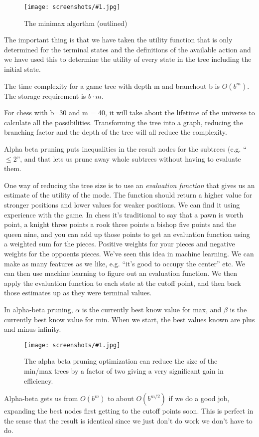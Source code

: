 \documentclass[a4, 12pt, english, USenglish]{scrreprt}
\newcommand{\screenshot}[2]{
\begin{figure}[htb]
\texttt{[image: screenshots/\#1.jpg]}
\label{#1}
\caption{#2}
\end{figure}}
\newcommand{\idx}[1]{{\em #1}\index{#1}}
\begin{document}
\screenshot{minmaxalgorithm}{The minimax algorthm (outlined)}

The important thing is that we have taken the utility function that is
only determined for the terminal states and the definitions of the
available action and we have used this to determine the utility of
every state in the tree including the initial state.  

The time complexity for a game tree with depth m and branchout b is
\(O(b^m)\).  The storage requirement is \(b\cdot m\).

For chess with b=30 and m = 40, it will take about the lifetime of the
universe to calculate all the possibilities.   Transforming the tree
into a graph, reducing the branching factor and the depth of the
tree will all reduce the complexity.

Alpha beta pruning puts inequalities in the result nodes for the
subtrees (e.g. ``\(\leq 2\)'', and that lets us prune away whole
subtrees  without having to evaluate them.

One way of reducing the tree size is to use an \idx{evaluation
  function} that gives us an estimate of the utility of the mode.  The
function should return a higher value for stronger positions and lower
values for weaker positions.  We can find it using experience with the
game.  In chess it's traditional to say that a pawn is worth  point,
a knight three points a rook three points a bishop five points and the
queen nine, and you can add up those points to get an evaluation
function using a weighted sum for the pieces. Positive weights for
your pieces and negative weights for the oppoents pieces.  We've seen
this idea in machine learning.   We can make as many features as we
like, e.g. ``it's good to occupy the center''  etc.   We can then use
machine learning to figure out an evaluation function. We then apply
the evaluation function to each state at the cutoff point, and then
back those estimates up as they were terminal values.

In alpha-beta pruning, \(\alpha\) is the  currently best know value
for max, and \(\beta\) is the currently best know value for min.  When
we start, the best values known are plus and minus infinity.

\screenshot{alphabetapruning}{The alpha beta pruning optimization can
  reduce the size of the min/max trees by a factor of two giving a
  very significant gain in  efficiency.}

Alpha-beta gets us from \(O(b^m)\) to about \(O(b^{m/2})\)  if we do
a good job, expanding the best nodes first getting to the cutoff
points soon.  This is perfect in the sense that the result is
identical since we just don't do work we don't have to do.
\end{document}
